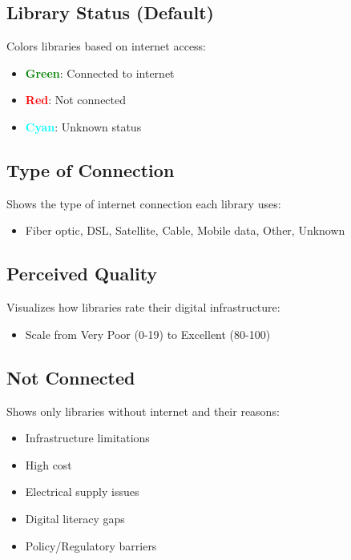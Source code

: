 \documentclass[11pt,a4paper]{article}
\begin{document}
\subsection{Library Status (Default)}

Colors libraries based on internet access:
\begin{itemize}
    \item \textcolor{green}{\textbf{Green}}: Connected to internet
    \item \textcolor{red}{\textbf{Red}}: Not connected
    \item \textcolor{cyan}{\textbf{Cyan}}: Unknown status
\end{itemize}

\subsection{Type of Connection}

Shows the type of internet connection each library uses:
\begin{itemize}
    \item Fiber optic, DSL, Satellite, Cable, Mobile data, Other, Unknown
\end{itemize}

\subsection{Perceived Quality}

Visualizes how libraries rate their digital infrastructure:
\begin{itemize}
    \item Scale from Very Poor (0-19) to Excellent (80-100)
\end{itemize}

\subsection{Not Connected}

Shows only libraries without internet and their reasons:
\begin{itemize}
    \item Infrastructure limitations
    \item High cost
    \item Electrical supply issues
    \item Digital literacy gaps
    \item Policy/Regulatory barriers
\end{itemize}
\end{document}
